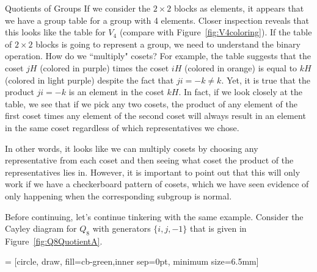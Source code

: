 \begin{section}{Quotients of Groups}
If we consider the $2\times 2$ blocks as elements, it appears that we have a group table for a group with 4 elements.  Closer inspection reveals that this looks like the table for $V_4$ (compare with Figure~\ref{fig:V4coloring}).  If the table of $2\times 2$ blocks is going to represent a group, we need to understand the binary operation.  How do we ``multiply" cosets?  For example, the table suggests that the coset $jH$ (colored in \textcolor{cb-purple}{purple}) times the coset $iH$ (colored in \textcolor{cb-orange}{orange}) is equal to $kH$ (colored in \textcolor{cb-lightpurple}{light purple}) despite the fact that $ji=-k\neq k$.  Yet, it is true that the product $ji=-k$ is an element in the coset $kH$.  In fact, if we look closely at the table, we see that if we pick any two cosets, the product of any element of the first coset times any element of the second coset will always result in an element in the same coset regardless of which representatives we chose.

In other words, it looks like we can multiply cosets by choosing any representative from each coset and then seeing what coset the product of the representatives lies in.  However, it is important to point out that this will only work if we have a checkerboard pattern of cosets, which we have seen evidence of only happening when the corresponding subgroup is normal.

Before continuing, let's continue tinkering with the same example.  Consider the Cayley diagram for $Q_8$ with generators $\{i,j,-1\}$ that is given in Figure~\ref{fig:Q8QuotientA}.

 = [circle, draw, fill=cb-green,inner sep=0pt, minimum size=6.5mm]


\end{section}
